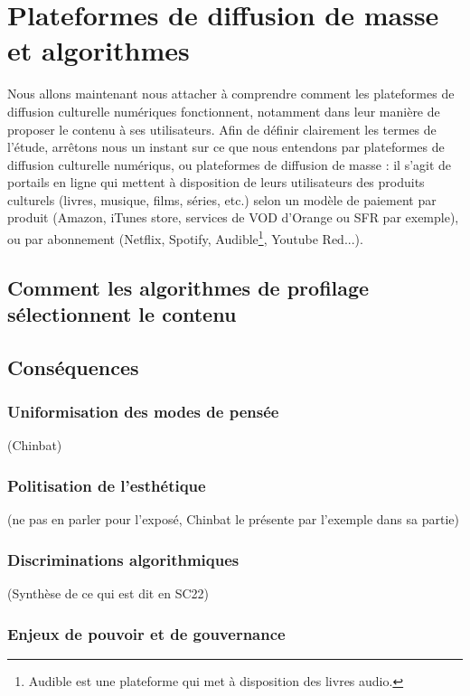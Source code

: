 \documentclass[a4paper,12pt]{report}
\begin{document}
\chapter{Plateformes de diffusion de masse et algorithmes}

Nous allons maintenant nous attacher à comprendre comment les plateformes de diffusion culturelle numériques fonctionnent, notamment dans leur manière de proposer le contenu à ses utilisateurs. Afin de définir clairement les termes de l'étude, arrêtons nous un instant sur ce que nous entendons par plateformes de diffusion culturelle numériqus, ou plateformes de diffusion de masse : il s'agit de portails en ligne qui mettent à disposition de leurs utilisateurs des produits culturels (livres, musique, films, séries, etc.) selon un modèle de paiement par produit (Amazon, iTunes store, services de VOD d'Orange ou SFR par exemple), ou par abonnement (Netflix, Spotify, Audible\footnote{Audible est une plateforme qui met à disposition des livres audio.}, Youtube Red...).

\section{Comment les algorithmes de profilage sélectionnent le contenu}

\section{Conséquences}

\subsection{Uniformisation des modes de pensée}

(Chinbat)

\subsection{Politisation de l'esthétique}

(ne pas en parler pour l'exposé, Chinbat le présente par l'exemple dans sa partie)

\subsection{Discriminations algorithmiques}

(Synthèse de ce qui est dit en SC22)

\subsection{Enjeux de pouvoir et de gouvernance}
\end{document}
